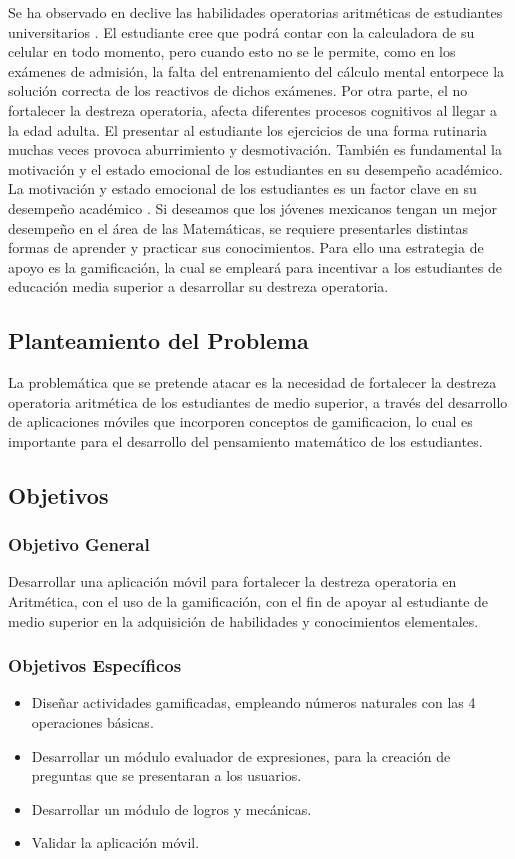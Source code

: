 \documentclass{article}
\begin{document}
Se ha observado en declive las habilidades operatorias aritméticas de estudiantes universitarios  \cite{tariq2002decline,carpenter2017psychology,huang2013gamification}. 
El estudiante cree que podrá contar con la calculadora de su celular en todo momento, pero cuando esto no se le permite, como en los exámenes de admisión, la falta del entrenamiento del cálculo mental entorpece la solución correcta de los reactivos 
de dichos exámenes. Por otra parte, el no fortalecer la destreza operatoria, afecta diferentes procesos cognitivos al llegar a la edad adulta\cite{martin2003loss}.
El presentar al estudiante los ejercicios de una forma rutinaria muchas veces provoca aburrimiento y desmotivación. 
También es fundamental la motivación y el estado emocional de los estudiantes en su desempeño académico. La motivación y estado emocional de los estudiantes es un factor clave en su desempeño académico \cite{larrazolo2013habilidades,ryan1997should}. Si deseamos que los jóvenes 
mexicanos tengan un mejor desempeño en el área de las Matemáticas, se requiere presentarles 
distintas formas de aprender y practicar sus conocimientos. Para ello una estrategia de 
apoyo es la gamificación, la cual se empleará para incentivar a los estudiantes de educación 
media superior a desarrollar su destreza operatoria.

\subsection{Planteamiento del Problema}
La problemática que se pretende atacar es la necesidad de fortalecer la destreza operatoria aritmética de los estudiantes de medio superior, a través del desarrollo de aplicaciones móviles que incorporen conceptos de gamificacion, lo cual es importante para el desarrollo del pensamiento matemático de los estudiantes. 
\subsection{Objetivos}
\subsubsection{Objetivo General}
Desarrollar una aplicación móvil para fortalecer la destreza operatoria en Aritmética, con el uso de la gamificación, con el fin de apoyar al estudiante de medio superior en la adquisición de habilidades y conocimientos elementales.

\subsubsection{Objetivos Específicos}
\begin{itemize}
	\item Diseñar actividades gamificadas, empleando números naturales con las 4 operaciones básicas.
	\item Desarrollar un módulo evaluador de expresiones, para la creación de preguntas que se presentaran a los usuarios.
	\item Desarrollar un módulo de logros y mecánicas.
	\item Validar la aplicación móvil. 
\end{itemize}
\end{document}
